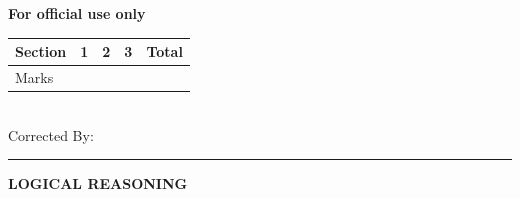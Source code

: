 \documentclass[12pt]{exam}
\begin{document}
\begin{center}
\textbf{For official use only}\\
\addpoints
\begin{tabular}{|l|c|c|c|c|}
\hline
Section & 1 & 2 & 3 & Total\\
\hline
Marks & & & &\\
\hline
\end{tabular}
\vspace{5mm}
\\Corrected By: \makebox[2in]{\hrulefill}
\end{center}


\noindent
\rule[2ex]{\textwidth}{2pt}

\centering \large \textbf{LOGICAL REASONING}

\normalsize
\end{document}
